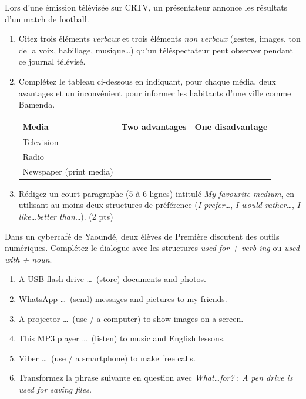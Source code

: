 \documentclass[11pt]{article}
\begin{document}
\begin{exercice}
Lors d'une émission télévisée sur CRTV, un présentateur annonce les résultats d'un match de football.
\begin{enumerate}
\item Citez trois éléments \emph{verbaux} et trois éléments \emph{non verbaux} (gestes, images, ton de la voix, habillage, musique\ldots) qu'un téléspectateur peut observer pendant ce journal télévisé.
\item Complétez le tableau ci-dessous en indiquant, pour chaque média, deux avantages et un inconvénient pour informer les habitants d'une ville comme Bamenda.
\begin{center}
\begin{tabular}{|l|l|l|}
\hline
\textbf{Media} & \textbf{Two advantages} & \textbf{One disadvantage} \\
\hline
Television & & \\
\hline
Radio & & \\
\hline
Newspaper (print media) & & \\
\hline
\end{tabular}
\end{center}
\item Rédigez un court paragraphe (5 à 6 lignes) intitulé \emph{My favourite medium}, en utilisant au moins deux structures de préférence (\emph{I prefer\ldots}, \emph{I would rather\ldots}, \emph{I like\ldots better than\ldots}). \hfill (2 pts)
\end{enumerate}
\end{exercice}

\begin{exercice}
Dans un cybercafé de Yaoundé, deux élèves de Première discutent des outils numériques. Complétez le dialogue avec les structures \emph{used for + verb-ing} ou \emph{used with + noun}.
\begin{enumerate}
\item A USB flash drive \ldots\ (store) documents and photos.
\item WhatsApp \ldots\ (send) messages and pictures to my friends.
\item A projector \ldots\ (use / a computer) to show images on a screen.
\item This MP3 player \ldots\ (listen) to music and English lessons.
\item Viber \ldots\ (use / a smartphone) to make free calls.
\item Transformez la phrase suivante en question avec \emph{What\ldots for?} : \emph{A pen drive is used for saving files.}
\end{enumerate}
\end{exercice}
\end{document}
